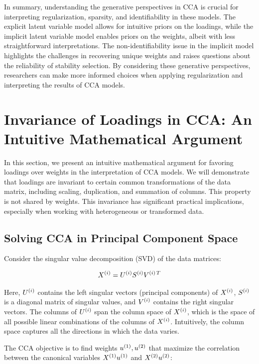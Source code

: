 In summary, understanding the generative perspectives in CCA is crucial for interpreting regularization, sparsity, and identifiability in these models. The explicit latent variable model allows for intuitive priors on the loadings, while the implicit latent variable model enables priors on the weights, albeit with less straightforward interpretations. The non-identifiability issue in the implicit model highlights the challenges in recovering unique weights and raises questions about the reliability of stability selection. By considering these generative perspectives, researchers can make more informed choices when applying regularization and interpreting the results of CCA models.

\section{Invariance of Loadings in CCA: An Intuitive Mathematical Argument}

In this section, we present an intuitive mathematical argument for favoring loadings over weights in the interpretation of CCA models. We will demonstrate that loadings are invariant to certain common transformations of the data matrix, including scaling, duplication, and summation of columns. This property is not shared by weights. This invariance has significant practical implications, especially when working with heterogeneous or transformed data.

\subsection{Solving CCA in Principal Component Space}
Consider the singular value decomposition (SVD) of the data matrices:

\begin{align}
X^{(i)} = U^{(i)}S^{(i)}V^{(i)\,T} \label{eq:svd}
\end{align}

Here, $U^{(i)}$ contains the left singular vectors (principal components) of $X^{(i)}$, $S^{(i)}$ is a diagonal matrix of singular values, and $V^{(i)}$ contains the right singular vectors. The columns of $U^{(i)}$ span the column space of $X^{(i)}$, which is the space of all possible linear combinations of the columns of $X^{(i)}$. Intuitively, the column space captures all the directions in which the data varies.

The CCA objective is to find weights $u^{(1)}, u^{(2)}$ that maximize the correlation between the canonical variables $X^{(1)}u^{(1)}$ and $X^{(2)}u^{(2)}$:


